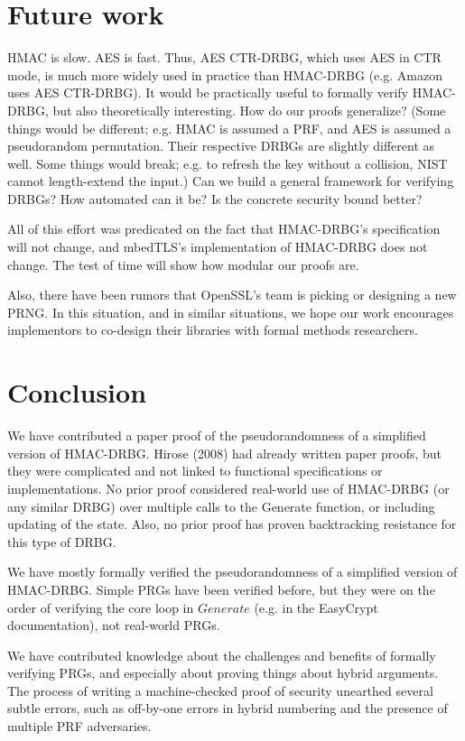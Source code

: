 \documentclass[12pt,lot, lof]{puthesis}
\begin{document}
{\section{Future work}

HMAC is slow. AES is fast. Thus, AES CTR-DRBG, which uses AES in CTR mode, is much more widely used in practice than HMAC-DRBG (e.g. Amazon uses AES CTR-DRBG). It would be practically useful to formally verify HMAC-DRBG, but also theoretically interesting. How do our proofs generalize? (Some things would be different; e.g. HMAC is assumed a PRF, and AES is assumed a pseudorandom permutation. Their respective DRBGs are slightly different as well. Some things would break; e.g. to refresh the key without a collision, NIST cannot length-extend the input.) Can we build a general framework for verifying DRBGs? How automated can it be? Is the concrete security bound better?

All of this effort was predicated on the fact that HMAC-DRBG's specification will not change, and mbedTLS's implementation of HMAC-DRBG does not change. The test of time will show how modular our proofs are.

Also, there have been rumors that OpenSSL's team is picking or designing a new PRNG. In this situation, and in similar situations, we hope our work encourages implementors to co-design their libraries with formal methods researchers.

\section{Conclusion}

We have contributed a paper proof of the pseudorandomness of a simplified version of HMAC-DRBG. Hirose (2008) had already written paper proofs, but they were complicated and not linked to functional specifications or implementations. No prior proof considered real-world use of HMAC-DRBG (or any similar DRBG) over multiple calls to the Generate function, or including updating of the state. Also, no prior proof has proven backtracking resistance for this type of DRBG.

We have mostly formally verified the pseudorandomness of a simplified version of HMAC-DRBG. Simple PRGs have been verified before, but they were on the order of verifying the core loop in $Generate$ (e.g. in the EasyCrypt documentation), not real-world PRGs.

We have contributed knowledge about the challenges and benefits of formally verifying PRGs, and especially about proving things about hybrid arguments. The process of writing a machine-checked proof of security unearthed several subtle errors, such as off-by-one errors in hybrid numbering and the presence of multiple PRF adversaries.

}
\end{document}
